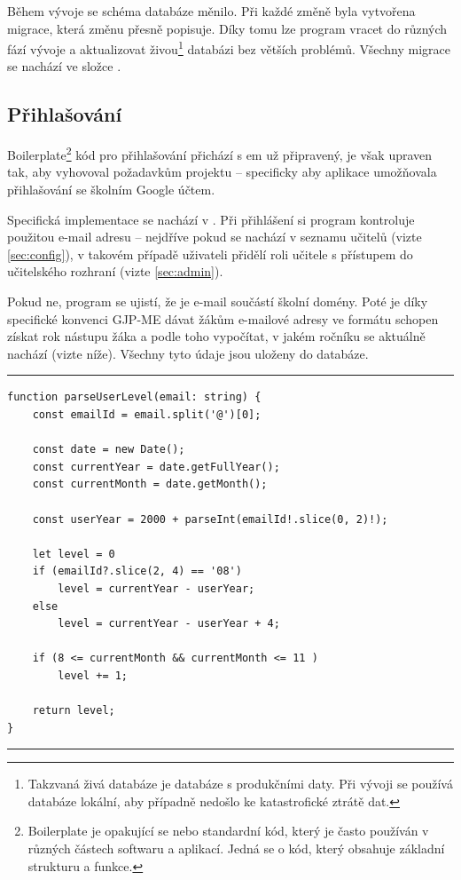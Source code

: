 Během vývoje se schéma databáze měnilo. Při každé změně byla vytvořena migrace, která změnu přesně popisuje. Díky tomu lze program vracet do různých fází vývoje a aktualizovat živou\footnote{Takzvaná živá databáze je databáze s produkčními daty. Při vývoji se používá databáze lokální, aby případně nedošlo ke katastrofické ztrátě dat.} databázi bez větších problémů. Všechny migrace se nachází ve složce .

\subsection{Přihlašování}
\label{sec:login}

Boilerplate\footnote{Boilerplate je opakující se nebo standardní kód, který je často používán v různých částech softwaru a aplikací. Jedná se o kód, který obsahuje základní strukturu a funkce.} kód pro přihlašování přichází s em už připravený, je však upraven tak, aby vyhovoval požadavkům projektu -- specificky aby aplikace umožňovala přihlašování se školním Google účtem.

Specifická implementace se nachází v . Při přihlášení si program kontroluje použitou e-mail adresu -- nejdříve pokud se nachází v seznamu učitelů (vizte \ref{sec:config}), v takovém případě uživateli přidělí roli učitele s přístupem do učitelského rozhraní (vizte \ref{sec:admin}). 

Pokud ne, program se ujistí, že je e-mail součástí školní domény. Poté je díky specifické konvenci GJP-ME dávat žákům e-mailové adresy ve formátu  schopen získat rok nástupu žáka a podle toho vypočítat, v jakém ročníku se aktuálně nachází (vizte níže). Všechny tyto údaje jsou uloženy do databáze.

\indent

\hrule
\begin{verbatim}
function parseUserLevel(email: string) {
    const emailId = email.split('@')[0];
    
    const date = new Date();
    const currentYear = date.getFullYear();
    const currentMonth = date.getMonth();
    
    const userYear = 2000 + parseInt(emailId!.slice(0, 2)!);
    
    let level = 0
    if (emailId?.slice(2, 4) == '08')
        level = currentYear - userYear;
    else
        level = currentYear - userYear + 4;
    
    if (8 <= currentMonth && currentMonth <= 11 )
        level += 1;
    
    return level;
}
\end{verbatim}
\hrule

